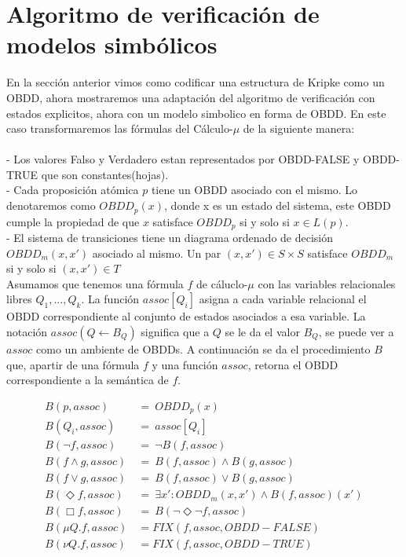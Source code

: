 \section{Algoritmo de verificación de modelos simbólicos}

En la sección anterior vimos como codificar una estructura de Kripke como un OBDD, ahora mostraremos una adaptación del algoritmo de verificación con estados explicitos, ahora con un modelo simbolico en forma de OBDD. En este caso transformaremos las fórmulas del Cálculo-$\mu$ de la siguiente manera\cite{Clarke:1}: \\
\\
- Los valores Falso y Verdadero estan representados por OBDD-FALSE y OBDD-TRUE que son constantes(hojas).\\
- Cada proposición atómica $p$ tiene un OBDD asociado con el mismo. Lo denotaremos como $OBDD_{p}(x)$, donde x es un estado del sistema, este OBDD cumple la propiedad de que $x$ satisface $OBDD_{p}$ si y solo si $x \in L(p)$. \\
- El sistema de transiciones tiene un diagrama ordenado de decisión $OBDD_{m}(x,x')$ asociado al mismo. Un par $(x,x') \in S \times S$ satisface $OBDD_{m}$ si y solo si $(x,x') \in T$ \\

Asumamos que tenemos una fórmula $f$ de cáluclo-$\mu$ con las variables relacionales libres $Q_{1},...,Q_{k}$. La función $assoc[Q_{i}]$ asigna a cada variable relacional el OBDD correspondiente al conjunto de estados asociados a esa variable. La notación $assoc(Q \gets B_{Q})$ significa que a $Q$ se le da el valor $B_{Q}$, se puede ver a $assoc$ como un ambiente de OBDDs. A continuación se da el procedimiento $B$ que, apartir de una fórmula $f$ y una función $assoc$, retorna el OBDD correspondiente a la semántica de $f$.

\begin{align*}
 B(p,assoc)\ &=\ OBDD_{p}(x) \\
 B(Q_{i},assoc)\ &=\ assoc[Q_{i}] \\
 B(\neg f,assoc)\ &=\ \neg B(f,assoc) \\
 B(f \land g,assoc)\ &=\ B(f,assoc) \land B(g,assoc) \\
 B(f \lor g,assoc)\ &=\ B(f,assoc) \lor B(g,assoc) \\
 B(\Diamond f,assoc)\ &=\ \exists x' : OBDD_{m}(x,x') \land B(f,assoc)(x') \\
 B(\Box f,assoc)\ &=\ B(\neg \Diamond \neg f, assoc) \\
 B(\mu Q. f, assoc) &= FIX(f,assoc,OBDD-FALSE) \\
 B(\nu Q. f, assoc) &= FIX(f,assoc,OBDD-TRUE) \\
\end{align*}

